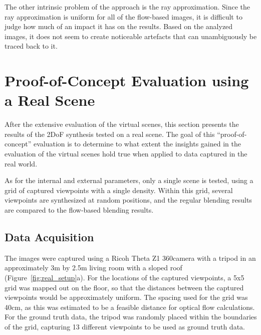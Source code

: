 The other intrinsic problem of the approach is the ray approximation. 
Since the ray approximation is uniform for all of the flow-based images, it is difficult to judge how much of an impact it has on the results. Based on the analyzed images, it does not seem to create noticeable artefacts that can unambiguously be traced back to it.




















\section{Proof-of-Concept Evaluation using a Real Scene} \label{sec:pof_eval}

After the extensive evaluation of the virtual scenes, this section presents the results of the 2DoF synthesis tested on a real scene. The goal of this ``proof-of-concept'' evaluation is to determine to what extent the insights gained in the evaluation of the virtual scenes hold true when applied to data captured in the real world.

As for the internal and external parameters, only a single scene is tested, using a grid of captured viewpoints with a single density. Within this grid, several viewpoints are synthesized at random positions, and the regular blending results are compared to the flow-based blending results.

\subsection{Data Acquisition}
The images were captured using a Ricoh Theta Z1 360\degree camera with a tripod in an approximately 3m by 2.5m living room with a sloped roof (Figure~\ref{fig:real_setup}a). For the locations of the captured viewpoints, a 5x5 grid was mapped out on the floor, so that the distances between the captured viewpoints would be approximately uniform. The spacing used for the grid was 40cm, as this was estimated to be a feasible distance for optical flow calculations. For the ground truth data, the tripod was randomly placed within the boundaries of the grid, capturing 13 different viewpoints to be used as ground truth data.

